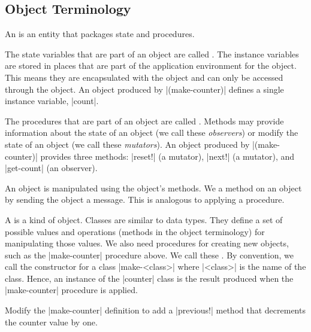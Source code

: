 \begin{schemeregion}
\subsection{Object Terminology}\label{sec:objectterminology}

An  is an entity that packages state and procedures.  

The state variables that are part of an object are called .  The instance variables are stored in places that are part of the application environment for the object.  This means they are encapsulated with the object and can only be accessed through the object.  An object produced by \scheme|(make-counter)| defines a single instance variable, \scheme|count|.

The procedures that are part of an object are called . Methods may provide information about the state of an object (we call these \emph{observers}) or modify the state of an object (we call these \emph{mutators}).  An object produced by \scheme|(make-counter)| provides three methods: \scheme|reset!| (a mutator), \scheme|next!| (a mutator), and \scheme|get-count| (an observer).  

An object is manipulated using the object's methods. We  a method on an object by sending the object a message.  This is analogous to applying a procedure.  

A  is a kind of object.  Classes are similar to data types.  They define a set of possible values and operations (methods in the object terminology) for manipulating those values.  
We also need procedures for creating new objects, such as the \scheme|make-counter| procedure above. We call these .  By convention, we call the constructor for a class \scheme|make-<class>| where \scheme|<class>| is the name of the class.  Hence, an instance of the \scheme|counter| class is the result produced when the \scheme|make-counter| procedure is applied.

\beforeex
\begin{exercise}
Modify the \scheme|make-counter| definition to add a \scheme|previous!| method that decrements the counter value by one.
\solution{\LATER{}}
\end{exercise}
\afterex


\end{schemeregion}
